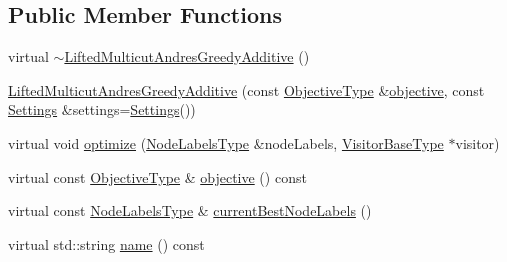 \subsection*{Public Member Functions}
\begin{DoxyCompactItemize}
\item 
virtual \hyperlink{classnifty_1_1graph_1_1lifted__multicut_1_1LiftedMulticutAndresGreedyAdditive_a46ae5a23ab16a83c444494a9e1fe6716}{$\sim$\+Lifted\+Multicut\+Andres\+Greedy\+Additive} ()
\item 
\hyperlink{classnifty_1_1graph_1_1lifted__multicut_1_1LiftedMulticutAndresGreedyAdditive_a088701c4d448f36dbf6c549670632dea}{Lifted\+Multicut\+Andres\+Greedy\+Additive} (const \hyperlink{classnifty_1_1graph_1_1lifted__multicut_1_1LiftedMulticutAndresGreedyAdditive_aad174abbd547a6779d21b2707261ce91}{Objective\+Type} \&\hyperlink{classnifty_1_1graph_1_1lifted__multicut_1_1LiftedMulticutAndresGreedyAdditive_a267d174f69b6b76f6808725243b0b2c2}{objective}, const \hyperlink{structnifty_1_1graph_1_1lifted__multicut_1_1LiftedMulticutAndresGreedyAdditive_1_1Settings}{Settings} \&settings=\hyperlink{structnifty_1_1graph_1_1lifted__multicut_1_1LiftedMulticutAndresGreedyAdditive_1_1Settings}{Settings}())
\item 
virtual void \hyperlink{classnifty_1_1graph_1_1lifted__multicut_1_1LiftedMulticutAndresGreedyAdditive_a807fd8f815577d5e8e9d12269e3b6f60}{optimize} (\hyperlink{classnifty_1_1graph_1_1lifted__multicut_1_1LiftedMulticutAndresGreedyAdditive_a43804693812be2e174e03525c85cd513}{Node\+Labels\+Type} \&node\+Labels, \hyperlink{classnifty_1_1graph_1_1lifted__multicut_1_1LiftedMulticutAndresGreedyAdditive_a4531913f0d3f10d228ee28cb983f668c}{Visitor\+Base\+Type} $\ast$visitor)
\item 
virtual const \hyperlink{classnifty_1_1graph_1_1lifted__multicut_1_1LiftedMulticutAndresGreedyAdditive_aad174abbd547a6779d21b2707261ce91}{Objective\+Type} \& \hyperlink{classnifty_1_1graph_1_1lifted__multicut_1_1LiftedMulticutAndresGreedyAdditive_a267d174f69b6b76f6808725243b0b2c2}{objective} () const 
\item 
virtual const \hyperlink{classnifty_1_1graph_1_1lifted__multicut_1_1LiftedMulticutAndresGreedyAdditive_a43804693812be2e174e03525c85cd513}{Node\+Labels\+Type} \& \hyperlink{classnifty_1_1graph_1_1lifted__multicut_1_1LiftedMulticutAndresGreedyAdditive_a132fb579b1756c9a13ddd115dd56670a}{current\+Best\+Node\+Labels} ()
\item 
virtual std\+::string \hyperlink{classnifty_1_1graph_1_1lifted__multicut_1_1LiftedMulticutAndresGreedyAdditive_af0d2791716c89e177e8eaf1cff4d1a17}{name} () const 
\end{DoxyCompactItemize}


